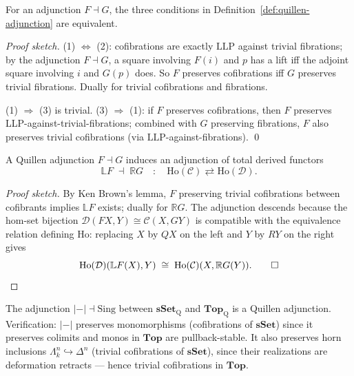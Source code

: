 \begin{theorem}
\label{thm:quillen-adj-equiv}
For an adjunction $F \dashv G$, the three conditions in
Definition~\ref{def:quillen-adjunction} are equivalent.
\end{theorem}

\begin{proof}[Proof sketch]
(1) $\Leftrightarrow$ (2): cofibrations are exactly $\mathrm{LLP}$ against
trivial fibrations; by the adjunction $F \dashv G$, a square involving
$F(i)$ and $p$ has a lift iff the adjoint square involving $i$ and $G(p)$
does. So $F$ preserves cofibrations iff $G$ preserves trivial fibrations.
Dually for trivial cofibrations and fibrations.

(1) $\Rightarrow$ (3) is trivial. (3) $\Rightarrow$ (1): if $F$
preserves cofibrations, then $F$ preserves LLP-against-trivial-fibrations;
combined with $G$ preserving fibrations, $F$ also preserves trivial
cofibrations (via $\mathrm{LLP}$-against-fibrations). \qed
\end{proof}

\begin{theorem}
\label{thm:derived-adjunction}
A Quillen adjunction $F \dashv G$ induces an adjunction of total derived
functors
\begin{equation*}
  \mathbb{L} F \;\dashv\; \mathbb{R} G \quad : \quad \mathrm{Ho}(\mathcal{C}) \rightleftarrows \mathrm{Ho}(\mathcal{D}).
\end{equation*}
\end{theorem}

\begin{proof}[Proof sketch]
By Ken Brown's lemma, $F$ preserving trivial cofibrations between
cofibrants implies $\mathbb{L}F$ exists; dually for $\mathbb{R}G$. The
adjunction descends because the hom-set bijection $\mathcal{D}(FX, Y)
\cong \mathcal{C}(X, GY)$ is compatible with the equivalence relation
defining $\mathrm{Ho}$: replacing $X$ by $QX$ on the left and $Y$ by $RY$
on the right gives
\begin{equation*}
  \mathrm{Ho}(\mathcal{D})(\mathbb{L} F (X), Y) \;\cong\; \mathrm{Ho}(\mathcal{C})(X, \mathbb{R} G (Y)). \qed
\end{equation*}
\end{proof}

\begin{example_thm}
\label{ex:realization-quillen}
The adjunction $\lvert{-}\rvert \dashv \mathrm{Sing}$ between
$\mathbf{sSet}_{\mathrm{Q}}$ and $\mathbf{Top}_{\mathrm{Q}}$ is a
Quillen adjunction. Verification: $\lvert{-}\rvert$ preserves
monomorphisms (cofibrations of $\mathbf{sSet}$) since it preserves
colimits and monos in $\mathbf{Top}$ are pullback-stable. It also
preserves horn inclusions $\Lambda^n_k \hookrightarrow \Delta^n$
(trivial cofibrations of $\mathbf{sSet}$), since their realizations are
deformation retracts — hence trivial cofibrations in $\mathbf{Top}$.
\end{example_thm}


